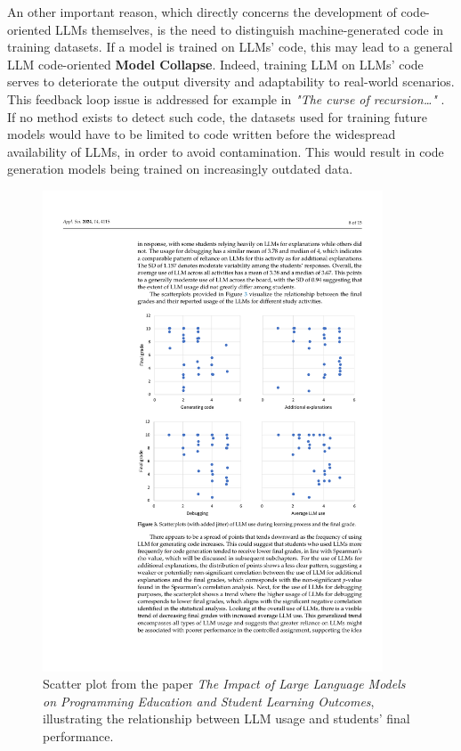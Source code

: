 \vspace{1\baselineskip}
\noindent

An other important reason, 
which directly 
concerns the development of code-oriented 
LLMs themselves, is the need to distinguish 
machine-generated code in training datasets. 
If a model is trained on LLMs' code, this may lead to a 
general LLM code-oriented \textbf{Model Collapse}. 
Indeed, training LLM on LLMs' code serves to deteriorate the 
output diversity and adaptability to real-world scenarios.
This feedback loop issue is addressed for example in 
\textit{"The curse of recursion…"} 
\cite{shumailov2023curse}.
If no method exists to detect such code, the 
datasets used for training future models would 
have to be limited to code written before the 
widespread availability of LLMs, in order to 
avoid contamination. This would result in 
code generation models being trained on 
increasingly outdated data. 



\begin{figure}[H]
    \centering
    \includegraphics[width=0.9\textwidth]{img/1/scatterplot.pdf}
    \caption{Scatter plot from the paper 
        \emph{The Impact of Large Language 
        Models on Programming Education and 
        Student Learning Outcomes}, 
        illustrating the relationship between 
        LLM usage and students' final performance.}

    \label{fig:scatterplot}
\end{figure}



